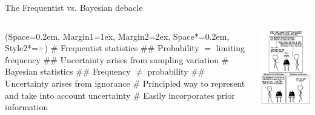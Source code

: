\documentclass[12pt, aspectratio=149]{beamer}
\newcommand{\listSpace}{0.2em}
\theoremstyle{plain}
\begin{document}
\begin{frame}[fragile]{The Frequentist vs. Bayesian debacle}
	\begin{columns}
		\begin{column}{0.7\linewidth}
			\begin{easylist}[itemize]
				\ListProperties(Space=\listSpace, Margin1=1ex, Margin2=2ex, Space*=\listSpace, Style2*=$\color{bggraydark}\blacktriangleright$\space)
				# Frequentist statistics
				## Probability $=$ limiting frequency
				## Uncertainty arises from sampling variation
				# Bayesian statistics
				## Frequency $\neq$ probability
				## Uncertainty arises from ignorance
				# Principled way to represent and take into account uncertainty
				# Easily incorporates prior information
			\end{easylist}
		\end{column}
		\begin{column}{0.3\textwidth}
			\includegraphics[height=0.7\textheight]{figs/relevant_xkcd.png}
		\end{column}
	\end{columns}
\end{frame}
\end{document}
